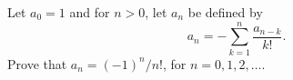 Let $a_0 = 1$ and for $n > 0$, let $a_n$ be defined by
$$ a_n = - \sum_{k=1}^{n} \frac{a_{n-k}}{k!}. $$
Prove that $a_n = (-1)^n / n!$, for $n = 0, 1, 2, \dots$.
